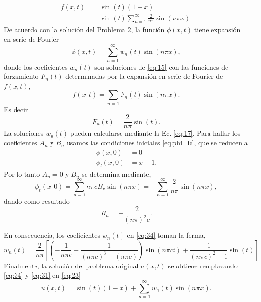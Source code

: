 \documentclass[11pt]{article}
\begin{document}
\begin{align}
  \label{eq:32}
  f(x,t) &= \sin(t)(1-x) \\
         &= \sin(t) \sum_{n=1}^\infty \frac{2}{n\pi}\sin(n\pi x).
\end{align}
De acuerdo con la soluci\'on del Problema 2, la funci\'on $\phi(x,t)$ tiene expansi\'on en serie de Fourier
\begin{equation}
  \label{eq:34}
  \phi(x, t) = \sum_{n=1}^\infty w_n(t)\sin(n\pi x),
\end{equation}
donde los coeficientes $w_n(t)$ son soluciones de \eqref{eq:15} con las funciones de forzamiento $F_n(t)$ determinadas por la expansi\'on en serie de Fourier de $f(x,t)$,
\begin{equation}
f(x,t) = \sum_{n=1} F_n(t) \sin(n\pi x).
\end{equation}
Es decir
\begin{equation}
  \label{eq:35}
  F_n(t) = \frac{2}{n\pi} \sin(t).
\end{equation}
La soluciones $w_n(t)$ pueden calcularse mediante la Ec. \eqref{eq:17}. Para hallar los coeficientes $A_n$ y $B_n$ usamos las condiciones iniciales \eqref{eq:phi_ic}, que se reducen a
\begin{subequations}
  \begin{align}
    \phi(x,0) &= 0\\
    \phi_t(x,0) &= x-1.
  \end{align}
\end{subequations}
Por lo tanto $A_n = 0$ y $B_n$ se determina mediante,
\begin{equation}
  \label{eq:40}
  \phi_t(x,0) = \sum_{n=1}^\infty n\pi c B_n \sin(n\pi x) = -\sum_{n=1}^\infty \frac{2}{n\pi} \sin(n\pi x),
\end{equation}
dando como resultado
\begin{equation}
  \label{eq:41}
  B_n = -\frac{2}{(n\pi)^2 c}.
\end{equation}

En consecuencia, los coeficientes $w_n(t)$ en \eqref{eq:34} toman la forma,
\begin{equation}
  w_n(t) = \frac{2}{n\pi}\left[\left( -\frac{1}{n\pi c} -\frac{1}{(n\pi c)^3 - (n\pi c)} \right)\sin(n\pi ct)
    + \frac{1}{(n\pi c)^2-1}\sin(t) \right]
\end{equation}
Finalmente, la soluci\'on del problema original $u(x,t)$ se obtiene remplazando \eqref{eq:34} y \eqref{eq:31} en \eqref{eq:23}
\begin{equation}
  \label{eq:39}
    u(x,t) = \sin(t)(1-x) + \sum_{n=1}^\infty w_n(t) \sin(n\pi x).
\end{equation}
\end{document}
